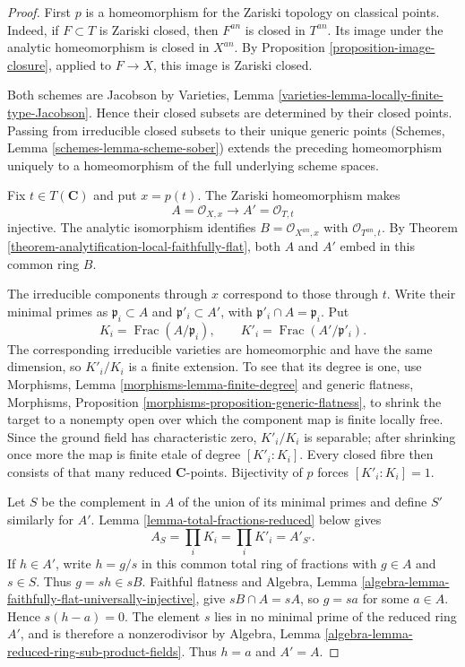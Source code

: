 \begin{proof}
First $p$ is a homeomorphism for the Zariski topology on classical points.
Indeed, if $F\subset T$ is Zariski closed, then $F^{an}$ is closed in
$T^{an}$. Its image under the analytic homeomorphism is closed in $X^{an}$.
By Proposition \ref{proposition-image-closure}, applied to $F\to X$, this
image is Zariski closed.

Both schemes are Jacobson by Varieties, Lemma
\ref{varieties-lemma-locally-finite-type-Jacobson}. Hence their closed subsets
are determined by their closed points. Passing from irreducible closed subsets
to their unique generic points (Schemes, Lemma
\ref{schemes-lemma-scheme-sober}) extends the preceding homeomorphism uniquely
to a homeomorphism of the full underlying scheme spaces.

Fix $t\in T(\mathbf C)$ and put $x=p(t)$. The Zariski homeomorphism makes
$$
A=\mathcal O_{X,x}\longrightarrow A'=\mathcal O_{T,t}
$$
injective. The analytic isomorphism identifies
$B=\mathcal O_{X^{an},x}$ with $\mathcal O_{T^{an},t}$. By
Theorem \ref{theorem-analytification-local-faithfully-flat}, both $A$ and
$A'$ embed in this common ring $B$.

The irreducible components through $x$ correspond to those through $t$.
Write their minimal primes as $\mathfrak p_i\subset A$ and
$\mathfrak p'_i\subset A'$, with
$\mathfrak p'_i\cap A=\mathfrak p_i$. Put
$$
K_i=\operatorname{Frac}(A/\mathfrak p_i),
\qquad
K'_i=\operatorname{Frac}(A'/\mathfrak p'_i).
$$
The corresponding irreducible varieties are homeomorphic and have the same
dimension, so $K'_i/K_i$ is a finite extension. To see that its degree is one,
use Morphisms, Lemma \ref{morphisms-lemma-finite-degree} and generic flatness,
Morphisms, Proposition \ref{morphisms-proposition-generic-flatness}, to shrink
the target to a nonempty open over which the component map is finite locally
free. Since the ground field has characteristic zero, $K'_i/K_i$ is separable;
after shrinking once more the map is finite etale of degree
$[K'_i:K_i]$. Every closed fibre then consists of that many reduced
$\mathbf C$-points. Bijectivity of $p$ forces $[K'_i:K_i]=1$.

Let $S$ be the complement in $A$ of the union of its minimal primes and define
$S'$ similarly for $A'$. Lemma \ref{lemma-total-fractions-reduced} below gives
$$
A_S=\prod_iK_i=\prod_iK'_i=A'_{S'}.
$$
If $h\in A'$, write $h=g/s$ in this common total ring of fractions with
$g\in A$ and $s\in S$. Thus $g=sh\in sB$. Faithful flatness and Algebra,
Lemma \ref{algebra-lemma-faithfully-flat-universally-injective}, give
$sB\cap A=sA$, so $g=sa$ for some $a\in A$. Hence $s(h-a)=0$. The element
$s$ lies in no minimal prime of the reduced ring $A'$, and is therefore a
nonzerodivisor by Algebra, Lemma
\ref{algebra-lemma-reduced-ring-sub-product-fields}. Thus $h=a$ and $A'=A$.


\end{proof}
